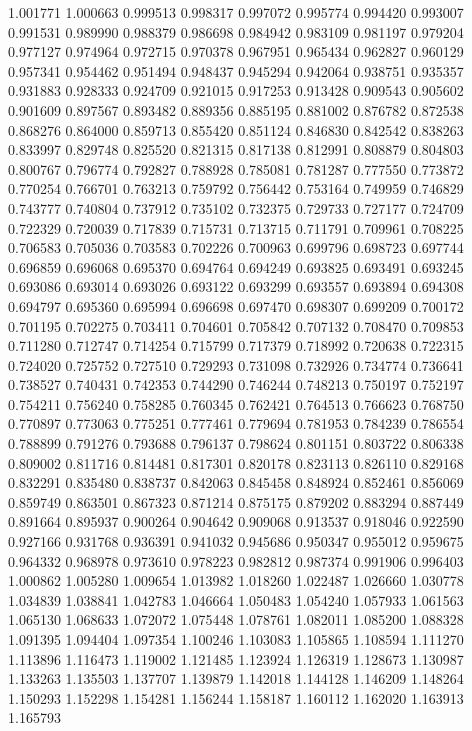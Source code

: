 1.001771
1.000663
0.999513
0.998317
0.997072
0.995774
0.994420
0.993007
0.991531
0.989990
0.988379
0.986698
0.984942
0.983109
0.981197
0.979204
0.977127
0.974964
0.972715
0.970378
0.967951
0.965434
0.962827
0.960129
0.957341
0.954462
0.951494
0.948437
0.945294
0.942064
0.938751
0.935357
0.931883
0.928333
0.924709
0.921015
0.917253
0.913428
0.909543
0.905602
0.901609
0.897567
0.893482
0.889356
0.885195
0.881002
0.876782
0.872538
0.868276
0.864000
0.859713
0.855420
0.851124
0.846830
0.842542
0.838263
0.833997
0.829748
0.825520
0.821315
0.817138
0.812991
0.808879
0.804803
0.800767
0.796774
0.792827
0.788928
0.785081
0.781287
0.777550
0.773872
0.770254
0.766701
0.763213
0.759792
0.756442
0.753164
0.749959
0.746829
0.743777
0.740804
0.737912
0.735102
0.732375
0.729733
0.727177
0.724709
0.722329
0.720039
0.717839
0.715731
0.713715
0.711791
0.709961
0.708225
0.706583
0.705036
0.703583
0.702226
0.700963
0.699796
0.698723
0.697744
0.696859
0.696068
0.695370
0.694764
0.694249
0.693825
0.693491
0.693245
0.693086
0.693014
0.693026
0.693122
0.693299
0.693557
0.693894
0.694308
0.694797
0.695360
0.695994
0.696698
0.697470
0.698307
0.699209
0.700172
0.701195
0.702275
0.703411
0.704601
0.705842
0.707132
0.708470
0.709853
0.711280
0.712747
0.714254
0.715799
0.717379
0.718992
0.720638
0.722315
0.724020
0.725752
0.727510
0.729293
0.731098
0.732926
0.734774
0.736641
0.738527
0.740431
0.742353
0.744290
0.746244
0.748213
0.750197
0.752197
0.754211
0.756240
0.758285
0.760345
0.762421
0.764513
0.766623
0.768750
0.770897
0.773063
0.775251
0.777461
0.779694
0.781953
0.784239
0.786554
0.788899
0.791276
0.793688
0.796137
0.798624
0.801151
0.803722
0.806338
0.809002
0.811716
0.814481
0.817301
0.820178
0.823113
0.826110
0.829168
0.832291
0.835480
0.838737
0.842063
0.845458
0.848924
0.852461
0.856069
0.859749
0.863501
0.867323
0.871214
0.875175
0.879202
0.883294
0.887449
0.891664
0.895937
0.900264
0.904642
0.909068
0.913537
0.918046
0.922590
0.927166
0.931768
0.936391
0.941032
0.945686
0.950347
0.955012
0.959675
0.964332
0.968978
0.973610
0.978223
0.982812
0.987374
0.991906
0.996403
1.000862
1.005280
1.009654
1.013982
1.018260
1.022487
1.026660
1.030778
1.034839
1.038841
1.042783
1.046664
1.050483
1.054240
1.057933
1.061563
1.065130
1.068633
1.072072
1.075448
1.078761
1.082011
1.085200
1.088328
1.091395
1.094404
1.097354
1.100246
1.103083
1.105865
1.108594
1.111270
1.113896
1.116473
1.119002
1.121485
1.123924
1.126319
1.128673
1.130987
1.133263
1.135503
1.137707
1.139879
1.142018
1.144128
1.146209
1.148264
1.150293
1.152298
1.154281
1.156244
1.158187
1.160112
1.162020
1.163913
1.165793
